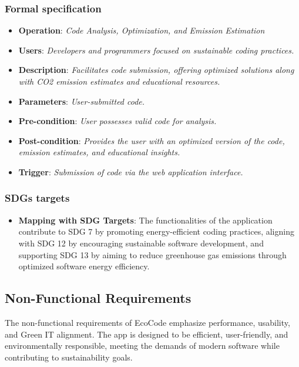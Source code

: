 \documentclass[conference,compsoc]{IEEEtran}
\begin{document}
\subsubsection{Formal specification}
\begin{itemize}
    \item \textbf{Operation}: \textit{Code Analysis, Optimization, and Emission Estimation}
    \item \textbf{Users}: \textit{Developers and programmers focused on sustainable coding practices.}
    \item \textbf{Description}: \textit{Facilitates  code submission, offering optimized solutions along with CO2 emission estimates and educational resources.}
    \item \textbf{Parameters}: \textit{User-submitted  code.}
    \item \textbf{Pre-condition}: \textit{User possesses valid  code for analysis.}
    \item \textbf{Post-condition}: \textit{Provides the user with an optimized version of the code, emission estimates, and educational insights.}
    \item \textbf{Trigger}: \textit{Submission of code via the web application interface.}
\end{itemize}

\subsubsection{SDGs targets}
\begin{itemize}
    \item \textbf{Mapping with SDG Targets}: The functionalities of the application contribute to SDG 7 by promoting energy-efficient coding practices, aligning with SDG 12 by encouraging sustainable software development, and supporting SDG 13 by aiming to reduce greenhouse gas emissions through optimized software energy efficiency.
\end{itemize}

\subsection{Non-Functional Requirements}
The non-functional requirements of EcoCode emphasize performance, usability, and Green IT alignment. The app is designed to be efficient, user-friendly, and environmentally responsible, meeting the demands of modern software while contributing to sustainability goals.
\end{document}
